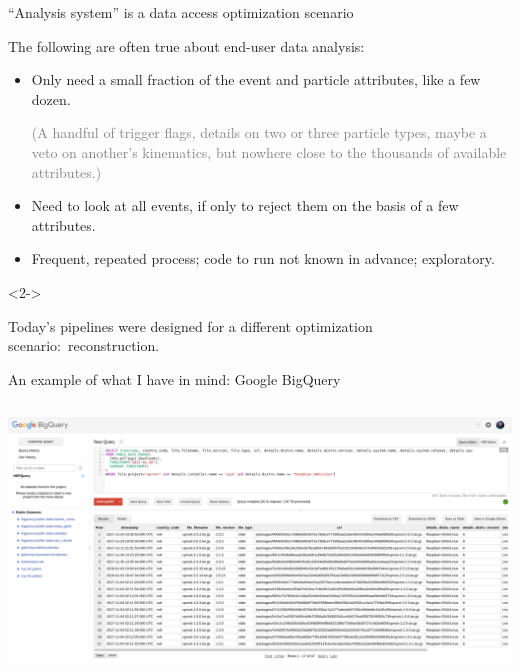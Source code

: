 \documentclass[aspectratio=169]{beamer}
\begin{document}
\begin{frame}{``Analysis system'' is a data access optimization scenario}
\vspace{0.25 cm}
\begin{block}{The following are often true about end-user data analysis:}
\begin{itemize}\setlength{\itemsep}{0.35 cm}
\item Only need a small fraction of the event and particle attributes, like a few dozen.

\vspace{0.1 cm}
\textcolor{gray}{(A handful of trigger flags, details on two or three particle types, maybe a veto on another's kinematics, but nowhere close to the thousands of available attributes.)}

\item Need to look at all events, if only to reject them on the basis of a few attributes.

\item Frequent, repeated process; code to run not known in advance; exploratory.
\end{itemize}
\end{block}

\begin{uncoverenv}<2->\begin{block}{Today's pipelines were designed for a different optimization \mbox{scenario: reconstruction.\hspace{-1 cm}}}
\vspace{0.25 cm}
\end{block}
\end{uncoverenv}
\end{frame}

\begin{frame}{An example of what I have in mind: Google BigQuery}
\vspace{0.25 cm}
\begin{columns}
\includegraphics[width=\linewidth]{bigquery.png}
\end{columns}
\end{frame}
\end{document}
